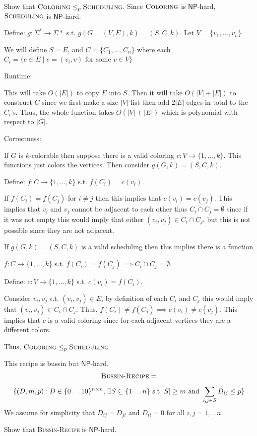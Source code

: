 \documentclass[12pt, letterpaper]{article}
\newcommand{\NP}{\mathsf{NP}}
\renewcommand{\t}[1]{\text{#1}}
\begin{document}
\begin{subproblem}{}
    Show that $\textsc{Coloring} \leq_p \textsc{Scheduling}$. Since $\textsc{Coloring}$ is $\NP$-hard, $\textsc{Scheduling}$ is $\NP$-hard.
\end{subproblem}
\begin{problemproof}
    Define: $g:\Sigma^* \to \Sigma*$ s.t. $g(G=(V,E),k)=(S,C,k)$. Let $V=\{v_1,\dots,v_n\}$

    We will define $S=E$, and $C=\{C_1,\dots,C_n\}$ where each $C_i=\{e \in E \mid e=(v_i,v) \t{ for some } v \in V\}$

    Runtime:

    This will take $O(|E|)$ to copy $E$ into $S$. Then it will take $O(|V|+|E|)$ to construct $C$ since we first make a size $|V|$ list then add $2|E|$ edges in total to the $C_i$'s. Thus, the whole function takes $O(|V|+|E|)$ which is polynomial with respect to $|G|$.

    Correctness:

    If $G$ is $k$-colorable then suppose there is a valid coloring $c: V \to \{1,\dots,k\}$. This functions just colors the vertices. Then consider $g(G,k)=(S,C,k)$.

    Define: $f : C \to \{1,\dots,k\}$ s.t. $f(C_i)=c(v_i)$.

    If $f(C_i)=f(C_j)$ for $i \neq j$ then this implies that $c(v_i) = c(v_j)$. This implies that $v_i$ and $v_j$ cannot be adjacent to each other thus $C_i \cap C_j =\emptyset$ since if it was not empty this would imply that either $(v_i,v_j) \in C_i \cap C_j$, but this is not possible since they are not adjacent.

    If $g(G,k)=(S,C,k)$ is a valid scheduling then this implies there is a function 
    
    $f : C \to \{1,\dots,k\}$ s.t. $f(C_i)=f(C_j) \implies C_i \cap C_j =\emptyset$.

    Define: $c : V \to \{1,\dots,k\}$ s.t. $c(v_i)=f(C_i)$.

    Consider $v_i,v_j$ s.t. $(v_i,v_j) \in E$, by definition of each $C_i$ and $C_j$ this would imply that $(v_i,v_j) \in C_i \cap C_j$. Thus, $f(C_i) \neq f(C_j) \implies c(v_i) \neq c(v_j)$. This implies that $c$ is a valid coloring since for each adjacent vertices they are a different colors.

    Thus, $\textsc{Coloring} \leq_p \textsc{Scheduling}$
\end{problemproof}
\newcommand{\Clique}{\textsc{Clique}}
\newcommand{\Recipe}{\textsc{Bussin-Recipe}}
\begin{problem}{This recipe is bussin but $\NP$-hard.}
    \[
        \Recipe =
    \]
    \[\{(D, m, p) : D \in \{0 \ldots 10\}^{n \times n} \text{, } \exists S \subseteq \{1 \ldots n\} \text{ s.t } |S| \geq m \text{ and } \sum_{i,j \in S} D_{ij} \leq p\}\]
    We assume for simplicity that $D_{ij} = D_{ji}$ and $D_{ii} = 0$ for all $i,j = 1, \ldots n$. 
    
Show that \Recipe$\;$is $\NP$-hard.
\end{problem}
\end{document}
